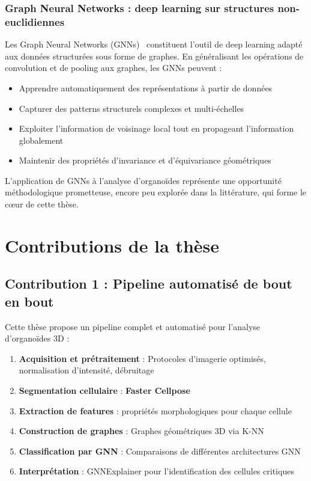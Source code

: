 \subsubsection{Graph Neural Networks : deep learning sur structures non-euclidiennes}

Les Graph Neural Networks (GNNs)~\cite{Wu2021,Zhou2020,Battaglia2018} constituent l'outil de deep learning adapté aux données structurées sous forme de graphes. En généralisant les opérations de convolution et de pooling aux graphes, les GNNs peuvent :
\begin{itemize}
    \item Apprendre automatiquement des représentations à partir de données
    \item Capturer des patterns structurels complexes et multi-échelles
    \item Exploiter l'information de voisinage local tout en propageant l'information globalement
    \item Maintenir des propriétés d'invariance et d'équivariance géométriques
\end{itemize}

L'application de GNNs à l'analyse d'organoïdes représente une opportunité méthodologique prometteuse, encore peu explorée dans la littérature, qui forme le cœur de cette thèse.

\section{Contributions de la thèse}

\subsection{Contribution 1 : Pipeline automatisé de bout en bout}

Cette thèse propose un pipeline complet et automatisé pour l'analyse d'organoïdes 3D :

\begin{enumerate}
    \item \textbf{Acquisition et prétraitement} : Protocoles d'imagerie optimisés, normalisation d'intensité, débruitage
    \item \textbf{Segmentation cellulaire} : \textbf{Faster Cellpose} 
    \item \textbf{Extraction de features} : propriétés morphologiques pour chaque cellule
    \item \textbf{Construction de graphes} : Graphes géométriques 3D via K-NN
    \item \textbf{Classification par GNN} : Comparaisons de différentes architectures GNN
    \item \textbf{Interprétation} : GNNExplainer pour l'identification des cellules critiques
\end{enumerate}


